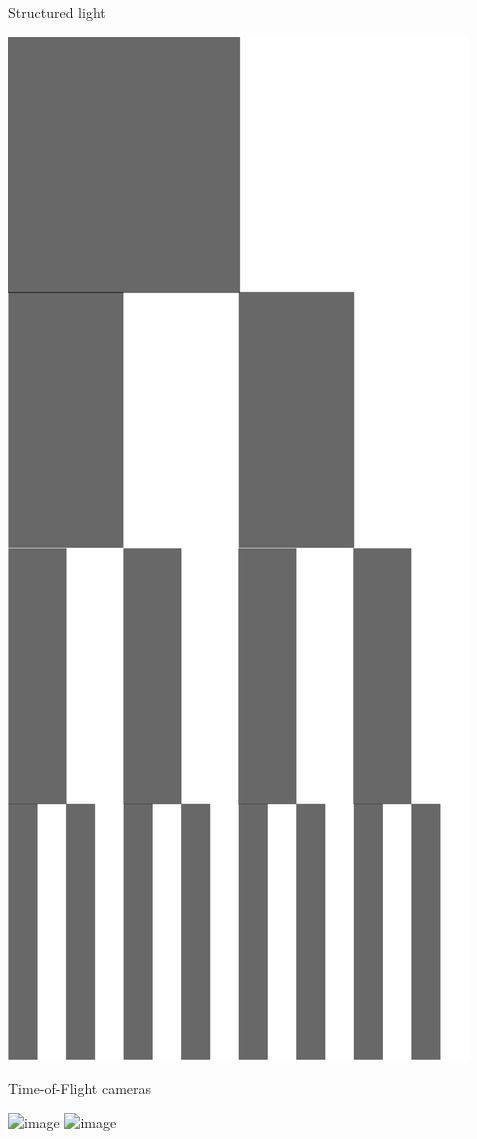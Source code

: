 \documentclass[compress]{beamer}
\begin{document}
\begin{frame}{Structured light}
    \begin{center}
        \includegraphics[width=0.8\linewidth]{structured_light}
    \end{center}
\end{frame}

\begin{frame}{Time-of-Flight cameras}
    \begin{center}
        \includegraphics<1>[width=0.8\linewidth]{kinect_xbox_one}
        \includegraphics<2>[width=0.8\linewidth]{tof1}
    \end{center}
\end{frame}
\end{document}
